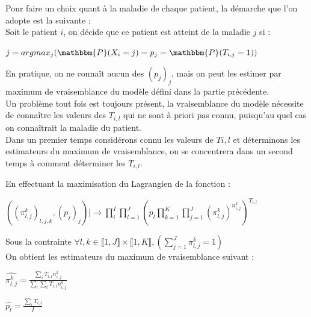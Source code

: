 \documentclass[frenchb]{report}
\newcommand{\1}{\mathbbm{1}}
\newcommand{\prob}{\mathbbm{P}}
\theoremstyle{definition}\newtheorem{defn}{Définition}
\theoremstyle{definition}\newtheorem{exm}{Exemple}
\theoremstyle{definition}\newtheorem{nota}{Notation}
\theoremstyle{definition}\newtheorem{rem}{Remarque}
\begin{document}
Pour faire un choix quant à la maladie de chaque patient, la démarche que l'on adopte est la suivante :\\

Soit le patient $i$, on décide que ce patient est atteint de la maladie $j$ si : \\
\begin{center}
	$j = argmax_j (\prob(X_i=j)=p_j=\prob(T_{i,j}=1))$
\end{center}


En pratique, on ne connaît aucun des $(p_j)_j$, mais on peut les estimer par maximum de vraisemblance du modèle défini dans la partie précédente.\\
Un problème tout fois est toujours présent, la vraisemblance du modèle nécessite de connaître les valeurs des $T_{i,l}$ qui ne sont à priori pas connu, puisqu'au quel cas on connaîtrait la maladie du patient.\\
Dans un premier temps considérons connu les valeurs de $T{i,l}$ et déterminons les estimateurs du maximum de vraisemblance, on se concentrera dans un second temps à comment déterminer les $T_{i,l}$.
\bigskip

En effectuant la maximisation du Lagrangien de la fonction : 

\begin{center}
	$\left( \left(\pi^k_{l,j}\right)_{l,j,k},(p_j)_j \right) |  \!\!\! \longrightarrow \displaystyle \prod_i^I \displaystyle \prod_{l=1}^J \left( p_l \displaystyle \prod_{k=1}^K \displaystyle \prod_{j = 1}^J \left(\pi^k_{l,j}\right)^{n^k_{i,j}} \right)^{T_{i,l}}$
\end{center}

Sous la contrainte $\forall l,k \in  \llbracket 1,J \rrbracket \times  \llbracket 1,K \rrbracket, \left(\displaystyle \sum_{j = 1}^J \pi^k_{l,j} = 1 \right)$\\

On obtient les estimateurs du maximum de vraisemblance suivant : \\

\begin{center} 
	$\widehat{\pi^{k}_{l,j}} = \displaystyle \frac{\displaystyle \sum_i T_{i,l} n^k_{i,j}}{\displaystyle \sum_l \displaystyle \sum_i T_{i,l} n^k_{i,j}}$
\end{center}
\begin{center}
	$\widehat{p_l} = \displaystyle \frac{\displaystyle \sum_i T_{i,l}}{I}$
\end{center}
\end{document}
